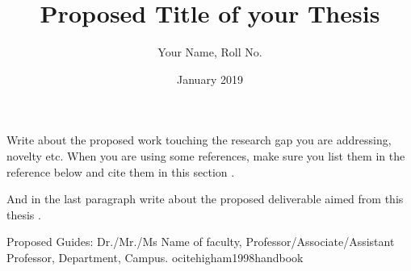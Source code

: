 \documentclass[12pt]{extarticle}
\title{Proposed Title of your Thesis}
\author{Your Name, Roll No.}
\date{January 2019}
\begin{document}
\maketitle

Write about the proposed work touching the research gap you are addressing, novelty etc. When you are using some references, make sure you list them in the reference below and cite them in this section \cite{Linhart2014} \cite{Linhart2008}.

And in the last paragraph write about the proposed deliverable aimed from this thesis  \cite{fractalwiki}.

Proposed Guides: Dr./Mr./Ms Name of faculty, Professor/Associate/Assistant Professor, Department, Campus.  
ocite{higham1998handbook}




\end{document}
